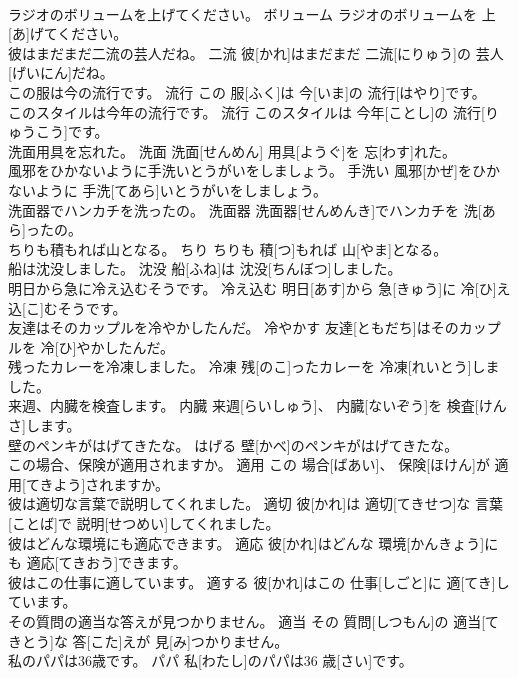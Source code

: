 \documentclass[8pt]{extreport}
\begin{document}
\begin{CJK}{UTF8}{min}
\\	ラジオのボリュームを上げてください。	ボリューム	ラジオのボリュームを 上[あ]げてください。	
\\	彼はまだまだ二流の芸人だね。	二流	彼[かれ]はまだまだ 二流[にりゅう]の 芸人[げいにん]だね。	
\\	この服は今の流行です。	流行	この 服[ふく]は 今[いま]の 流行[はやり]です。	
\\	このスタイルは今年の流行です。	流行	このスタイルは 今年[ことし]の 流行[りゅうこう]です。	
\\	洗面用具を忘れた。	洗面	洗面[せんめん] 用具[ようぐ]を 忘[わす]れた。	
\\	風邪をひかないように手洗いとうがいをしましょう。	手洗い	風邪[かぜ]をひかないように 手洗[てあら]いとうがいをしましょう。	
\\	洗面器でハンカチを洗ったの。	洗面器	洗面器[せんめんき]でハンカチを 洗[あら]ったの。	
\\	ちりも積もれば山となる。	ちり	ちりも 積[つ]もれば 山[やま]となる。	
\\	船は沈没しました。	沈没	船[ふね]は 沈没[ちんぼつ]しました。	
\\	明日から急に冷え込むそうです。	冷え込む	明日[あす]から 急[きゅう]に 冷[ひ]え 込[こ]むそうです。	
\\	友達はそのカップルを冷やかしたんだ。	冷やかす	友達[ともだち]はそのカップルを 冷[ひ]やかしたんだ。	
\\	残ったカレーを冷凍しました。	冷凍	残[のこ]ったカレーを 冷凍[れいとう]しました。	
\\	来週、内臓を検査します。	内臓	来週[らいしゅう]、 内臓[ないぞう]を 検査[けんさ]します。	
\\	壁のペンキがはげてきたな。	はげる	壁[かべ]のペンキがはげてきたな。	
\\	この場合、保険が適用されますか。	適用	この 場合[ばあい]、 保険[ほけん]が 適用[てきよう]されますか。	
\\	彼は適切な言葉で説明してくれました。	適切	彼[かれ]は 適切[てきせつ]な 言葉[ことば]で 説明[せつめい]してくれました。	
\\	彼はどんな環境にも適応できます。	適応	彼[かれ]はどんな 環境[かんきょう]にも 適応[てきおう]できます。	
\\	彼はこの仕事に適しています。	適する	彼[かれ]はこの 仕事[しごと]に 適[てき]しています。	
\\	その質問の適当な答えが見つかりません。	適当	その 質問[しつもん]の 適当[てきとう]な 答[こた]えが 見[み]つかりません。	
\\	私のパパは36歳です。	パパ	私[わたし]のパパは36 歳[さい]です。	

\end{CJK}
\end{document}
